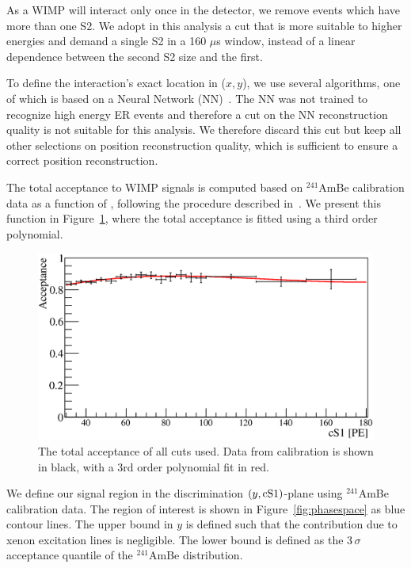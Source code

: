 As a WIMP will interact only once in the detector, we remove events which have more than one S2. We adopt in this analysis a cut that is more suitable to higher energies and demand a single S2 in a 160 $\mu$s window, instead of a linear dependence between the second S2 size and the first. 

To define the interaction's exact location in ($x,y$), we use several algorithms, one of which is based on a Neural Network (NN)~\cite{Aprile:2012vw}. The NN was not trained to recognize high energy ER events and therefore a cut on the NN reconstruction quality is not suitable for this analysis. We therefore discard this cut but keep all other selections on position reconstruction quality, which is sufficient to ensure a correct position reconstruction. 

The total acceptance to WIMP signals is computed based on $^{241}$AmBe calibration data as a function of \cSi, following the procedure described in~\cite{Aprile:2012vw}. We present this function in Figure~\ref{fig:Acc}, where the total acceptance is fitted using a third order polynomial.

\begin{figure}[t!]
\begin{minipage}{0.9\linewidth}
\centerline{\includegraphics[width=1.\linewidth]{Figures/Acceptance.eps}}
\end{minipage}
\caption{The total acceptance of all cuts used. Data from calibration is shown in black, with a 3rd order polynomial fit in red.}
\label{fig:Acc}
\end{figure}

We define our signal region in the discrimination $(y,\mathrm{cS1})$-plane using $^{241}$AmBe calibration data. 
The region of interest is shown in Figure~\ref{fig:phasespace} as blue contour lines. The upper bound in $y$ is defined such that the contribution due to xenon excitation lines is negligible. The lower bound is defined as the 3\,$\sigma$ acceptance quantile of the $^{241}$AmBe distribution.

